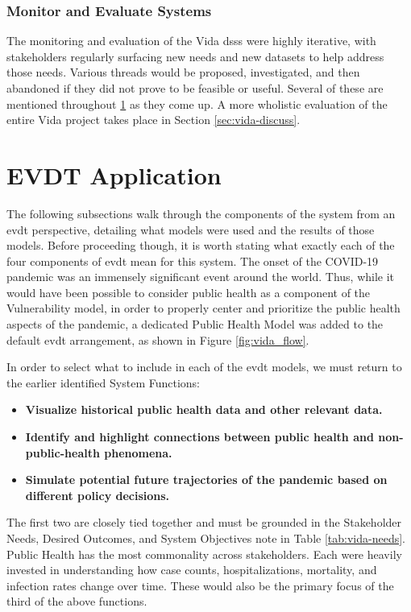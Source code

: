 \subsubsection{Monitor and Evaluate Systems}

The monitoring and evaluation of the Vida \acp{dss} were highly iterative, with stakeholders regularly surfacing new needs and new datasets to help address those needs. Various threads would be proposed, investigated, and then abandoned if they did not prove to be feasible or useful. Several of these are mentioned throughout \ref{sec:vida-evdt} as they come up. A more wholistic evaluation of the entire Vida project takes place in Section \ref{sec:vida-discuss}.

\section{EVDT Application} \label{sec:vida-evdt}

The following subsections walk through the components of the system from an \acf{evdt} perspective, detailing what models were used and the results of those models. Before proceeding though, it is worth stating what exactly each of the four components of \ac{evdt} mean for this system. The onset of the COVID-19 pandemic was an immensely significant event around the world. Thus, while it would have been possible to consider public health as a component of the Vulnerability model, in order to properly center and prioritize the public health aspects of the pandemic, a dedicated Public Health Model was added to the default \ac{evdt} arrangement, as shown in Figure \ref{fig:vida_flow}. 

In order to select what to include in each of the \ac{evdt} models, we must return to the earlier identified System Functions:

\begin{itemize}[itemsep=0pt,parsep=0pt]
	\item{\textbf{Visualize historical public health data and other relevant data.}}
	\item{\textbf{Identify and highlight connections between public health and non-public-health phenomena.}}
	\item{\textbf{Simulate potential future trajectories of the pandemic based on different policy decisions.}} 
\end{itemize}

The first two are closely tied together and must be grounded in the Stakeholder Needs, Desired Outcomes, and System Objectives note in Table \ref{tab:vida-needs}. Public Health has the most commonality across stakeholders. Each were heavily invested in understanding how case counts, hospitalizations, mortality, and infection rates change over time. These would also be the primary focus of the third of the above functions.

